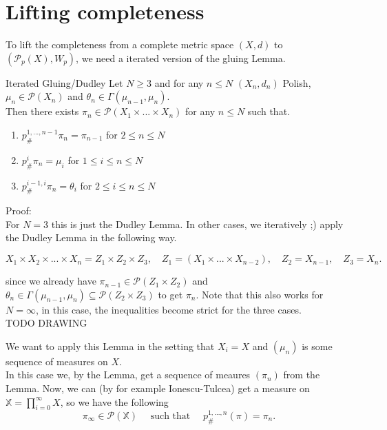 \documentclass[15pt]{article}
\begin{document}
\section*{Lifting completeness}

To lift the completeness from a complete metric space $(X,d)$ to $(\mathcal{P}_p(X), W_p)$, we need a iterated version of the gluing Lemma.

\begin{lemma}{Iterated Gluing/Dudley}{}
  Let $N \geq 3$ and for any $n \leq N$ $(X_n,d_n)$ Polish, $\mu_n \in \mathcal{P}(X_n)$ and $\theta_n \in \Gamma(\mu_{n-1},\mu_n)$. \\ 
  Then there exists $\pi_n \in \mathcal{P}(X_1\times ... \times X_n)$ for any $n \leq N$ such that.
  \begin{enumerate}
      \item $p^{1,...,n-1}_{\#} \pi_n = \pi_{n-1}$ for $2 \leq n \leq N$
      \item $p^i_{\#} \pi_n = \mu_i$ for $1 \leq i \leq n \leq N$
      \item $p^{i-1,i}_{\#} \pi_n = \theta_i$ for $2 \leq i\leq n \leq N$
  \end{enumerate}
\end{lemma}

Proof: 
\vspace{0.3cm} \\

For $N = 3$ this is just the Dudley Lemma. In other cases, we iteratively ;) apply the Dudley Lemma in the following way. 

$$X_1 \times X_2 \times ... \times X_n = Z_1 \times Z_2 \times Z_3, \quad Z_1 = (X_1 \times ... \times X_{n-2}), \quad Z_2 = X_{n-1}, \quad Z_3 = X_n.$$

since we already have $\pi_{n-1} \in \mathcal{P}(Z_1 \times Z_2)$ and $\theta_n \in \Gamma(\mu_{n-1}, \mu_{n}) \subseteq \mathcal{P}(Z_2 \times Z_3)$ to get $\pi_n$. Note that this also works for $N = \infty$, in this case, the inequalities become strict for the three cases. \\
TODO DRAWING

\bigbreak

We want to apply this Lemma in the setting that $X_i =X$ and $(\mu_n)$ is some sequence of measures on $X$. \\
In this case we, by the Lemma, get a sequence of meaures $(\pi_n)$ from the Lemma. Now, we can (by for example Ionescu-Tulcea) get a measure on $\mathbb{X} = \prod_{i = 0}^\infty X$, so we have the following $$\pi_\infty \in \mathcal{P}(\mathbb{X}) \quad \text{ such that } \quad p^{1,...,n}_{\#}(\pi) = \pi_n.$$
\end{document}
